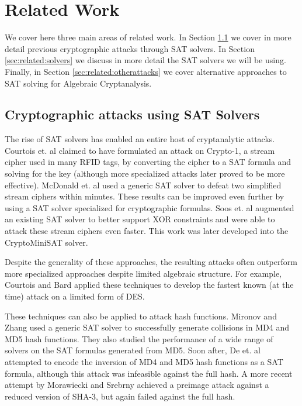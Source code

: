 \section{Related Work}
\label{sec:related}
We cover here three main areas of related work. In Section \ref{sec:related:satattacks} we cover in more detail previous cryptographic attacks through SAT solvers. In Section \ref{sec:related:solvers} we discuss in more detail the SAT solvers we will be using. Finally, in Section \ref{sec:related:otherattacks} we cover alternative approaches to SAT solving for Algebraic Cryptanalysis. 

\subsection{Cryptographic attacks using SAT Solvers}
\label{sec:related:satattacks}
The rise of SAT solvers has enabled an entire host of cryptanalytic attacks. Courtois et. al \cite{CNO08} claimed to have formulated an attack on Crypto-1, a stream cipher used in many RFID tags, by converting the cipher to a SAT formula and solving for the key (although more specialized attacks \cite{GGMRVSJ08} later proved to be more effective). McDonald et. al \cite{MCP07} used a generic SAT solver to defeat two simplified stream ciphers within minutes. These results can be improved even further by using a SAT solver specialized for cryptographic formulas. Soos et. al \cite{SNC09} augmented an existing SAT solver to better support XOR constraints and were able to attack these stream ciphers even faster. This work was later developed into the {CryptoMiniSAT} solver.

Despite the generality of these approaches, the resulting attacks often outperform more specialized approaches despite limited algebraic structure. For example, Courtois and Bard \cite{CB07} applied these techniques to develop the fastest known (at the time) attack on a limited form of DES.

These techniques can also be applied to attack hash functions. Mironov and Zhang \cite{MZ06} used a generic SAT solver to successfully generate collisions in MD4 and MD5 hash functions. They also studied the performance of a wide range of solvers on the SAT formulas generated from MD5. Soon after, De et. al \cite{DKV07} attempted to encode the inversion of MD4 and MD5 hash functions as a SAT formula, although this attack was infeasible against the full hash. A more recent attempt by Morawiecki and Srebrny \cite{MS13} achieved a preimage attack against a reduced version of SHA-3, but again failed against the full hash.

